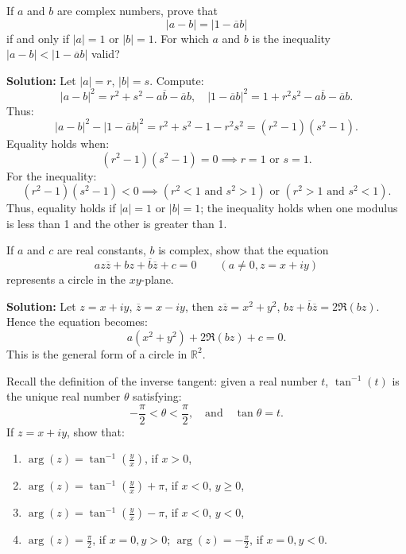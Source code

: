 \begin{problembox}
If \( a \) and \( b \) are complex numbers, prove that
\[
|a - b| = |1 - \overline{a}b|
\]
if and only if \( |a| = 1 \) or \( |b| = 1 \). For which \( a \) and \( b \) is the inequality \( |a - b| < |1 - \overline{a}b| \) valid?
\end{problembox}

\textbf{Solution:}
Let \( |a| = r \), \( |b| = s \). Compute:
\[
|a - b|^2 = r^2 + s^2 - a\overline{b} - \overline{a}b, \quad |1 - \overline{a}b|^2 = 1 + r^2 s^2 - a\overline{b} - \overline{a}b.
\]
Thus:
\[
|a - b|^2 - |1 - \overline{a}b|^2 = r^2 + s^2 - 1 - r^2 s^2 = (r^2 - 1)(s^2 - 1).
\]
Equality holds when:
\[
(r^2 - 1)(s^2 - 1) = 0 \implies r = 1 \text{ or } s = 1.
\]
For the inequality:
\[
(r^2 - 1)(s^2 - 1) < 0 \implies (r^2 < 1 \text{ and } s^2 > 1) \text{ or } (r^2 > 1 \text{ and } s^2 < 1).
\]
Thus, equality holds if \( |a| = 1 \) or \( |b| = 1 \); the inequality holds when one modulus is less than 1 and the other is greater than 1.

\begin{problembox}
If \( a \) and \( c \) are real constants, \( b \) is complex, show that the equation
\[
az\overline{z} + bz + \overline{b} \overline{z} + c = 0 \qquad (a \ne 0, z = x + iy)
\]
represents a circle in the \( xy \)-plane.
\end{problembox}

\textbf{Solution:}
Let \( z = x + iy \), \( \overline{z} = x - iy \), then \( z \overline{z} = x^2 + y^2 \), \( bz + \overline{b} \overline{z} = 2 \Re(b z) \). Hence the equation becomes:
\[
a(x^2 + y^2) + 2 \Re(b z) + c = 0.
\]
This is the general form of a circle in \( \mathbb{R}^2 \).

\begin{problembox}
Recall the definition of the inverse tangent: given a real number \( t \), \( \tan^{-1}(t) \) is the unique real number \( \theta \) satisfying:
\[
-\frac{\pi}{2} < \theta < \frac{\pi}{2}, \quad \text{and} \quad \tan \theta = t.
\]
If \( z = x + iy \), show that:
\begin{enumerate}[label=\alph*)]
\item \( \arg(z) = \tan^{-1}\left( \frac{y}{x} \right) \), if \( x > 0 \),
\item \( \arg(z) = \tan^{-1}\left( \frac{y}{x} \right) + \pi \), if \( x < 0 \), \( y \geq 0 \),
\item \( \arg(z) = \tan^{-1}\left( \frac{y}{x} \right) - \pi \), if \( x < 0 \), \( y < 0 \),
\item \( \arg(z) = \frac{\pi}{2} \), if \( x = 0, y > 0 \); \quad \( \arg(z) = -\frac{\pi}{2} \), if \( x = 0, y < 0 \).
\end{enumerate}
\end{problembox}

